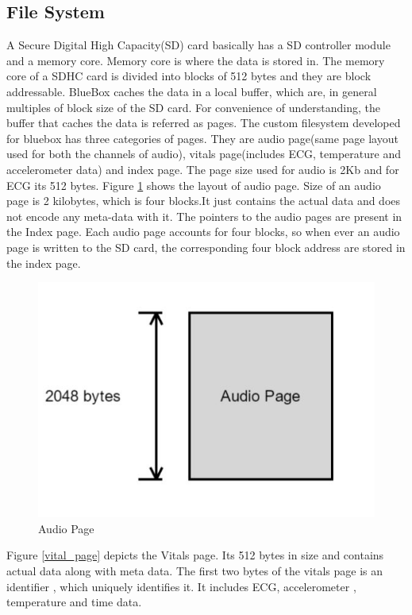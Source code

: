 \subsection{File System}
A Secure Digital High Capacity(SD) card basically has a SD controller module and a memory core. Memory core is where the data is stored in. The memory core of a SDHC card is divided into blocks of 512 bytes and they are block addressable.  BlueBox caches the data in a local buffer, which  are, in general multiples of block size of the SD card. For convenience of understanding, the buffer that caches the data is referred as pages. The custom filesystem developed for bluebox has three categories of pages. They are audio page(same page layout used for both the channels of audio), vitals page(includes ECG, temperature and accelerometer data) and index page. The page size used for audio is 2Kb and for ECG its 512 bytes.
 Figure \ref{audio_page} shows the layout of audio page. Size of an audio page is 2 kilobytes, which is four blocks.It just contains the actual data and does not encode any meta-data with it. The pointers to the audio pages are present in the Index page. Each audio page accounts for four blocks, so when ever an audio page is written to the SD card, the corresponding four block address are stored in the index page. 
\begin{figure}[h]
	\centering
	\includegraphics[scale = 0.5 ]{audio_page.JPG}
	\caption{Audio Page\label{audio_page}}
\end{figure}


 Figure \ref{vital_page} depicts the Vitals page. Its 512 bytes in size and contains actual data along with meta data. The first two bytes of the vitals page is an identifier , which uniquely identifies it. It includes ECG, accelerometer , temperature and time data. 

